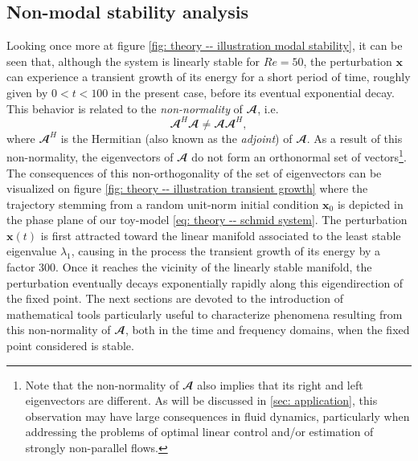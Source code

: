 
  \subsection{Non-modal stability analysis}
  \label{subsec: theory -- non-modal stability}

  Looking once more at figure \ref{fig: theory -- illustration modal stability}, it can be seen that, although the system is linearly stable for $Re=50$, the perturbation $\mathbf{x}$ can experience a transient growth of its energy for a short period of time, roughly given by $0 < t <100$ in the present case, before its eventual exponential decay. This behavior is related to the \emph{non-normality} of $\mathbfcal{A}$, i.e.\
  \begin{equation}
    \mathbfcal{A}^H \mathbfcal{A} \neq \mathbfcal{A} \mathbfcal{A}^H,
    \label{eq: theory -- non-normality equation}
  \end{equation}
  where $\mathbfcal{A}^H$ is the Hermitian (also known as the \emph{adjoint}) of $\mathbfcal{A}$. As a result of this non-normality, the eigenvectors of $\mathbfcal{A}$ do not form an orthonormal set of vectors\footnote{Note that the non-normality of $\mathbfcal{A}$ also implies that its right and left eigenvectors are different. As will be discussed in \textsection \ref{sec: application}, this observation may have large consequences in fluid dynamics, particularly when addressing the problems of optimal linear control and/or estimation of strongly non-parallel flows.}. The consequences of this non-orthogonality of the set of eigenvectors can be visualized on figure \ref{fig: theory -- illustration transient growth} where the trajectory stemming from a random unit-norm initial condition $\mathbf{x}_0$ is depicted in the phase plane of our toy-model \eqref{eq: theory -- schmid system}. The perturbation $\mathbf{x}(t)$ is first attracted toward the linear manifold associated to the least stable eigenvalue $\lambda_1$, causing in the process the transient growth of its energy by a factor 300. Once it reaches the vicinity of the linearly stable manifold, the perturbation eventually decays exponentially rapidly along this eigendirection of the fixed point. The next sections are devoted to the introduction of mathematical tools particularly useful to characterize phenomena resulting from this non-normality of $\mathbfcal{A}$, both in the time and frequency domains, when the fixed point considered is stable.

